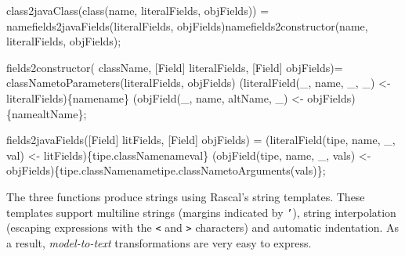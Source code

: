 \documentclass[submission,copyright,creativecommons]{eptcs}
\begin{document}
\begin{rascal}
 class2javaClass(class(name, literalFields, objFields)) =
    namefields2javaFields(literalFields, objFields)namefields2constructor(name, literalFields, objFields);
    
 fields2constructor( className, [Field] literalFields, [Field] objFields)=
    classNametoParameters(literalFields, objFields) (literalField(\_{}, name, \_{}, \_{}) \textless{}- literalFields)\{{}namename\}{} (objField(\_{}, name, altName, \_{}) \textless{}- objFields)\{{}namealtName\}{};
    
 fields2javaFields([Field] litFields, [Field] objFields) =
     (literalField(tipe, name, \_{}, val) \textless{}- litFields)\{{}tipe.classNamenameval\}{} (objField(tipe, name, \_{}, vals) \textless{}- objFields)\{{}tipe.classNamenametipe.classNametoArguments(vals)\}{};
\end{rascal}

The three functions produce strings using Rascal's string templates. These templates support  multiline strings (margins indicated by \texttt{'}), string interpolation (escaping expressions with the \texttt{<} and \texttt{>} characters) and automatic indentation. As a result,  \emph{model-to-text} transformations are very easy to express.
\end{document}
